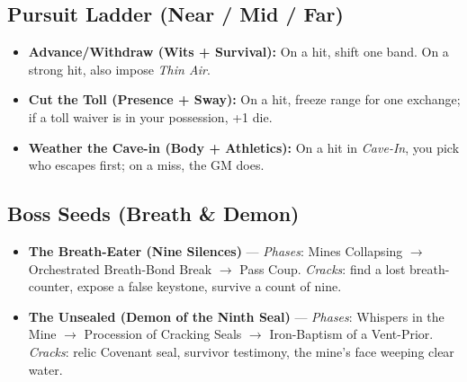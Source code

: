 \subsection*{Pursuit Ladder (Near / Mid / Far)}
\begin{itemize}
\item \textbf{Advance/Withdraw (Wits + Survival):} On a hit, shift one band. On a strong hit, also impose \emph{Thin Air}.
\item \textbf{Cut the Toll (Presence + Sway):} On a hit, freeze range for one exchange; if a toll waiver is in your possession, +1 die.
\item \textbf{Weather the Cave-in (Body + Athletics):} On a hit in \emph{Cave-In}, you pick who escapes first; on a miss, the GM does.
\end{itemize}

\subsection*{Boss Seeds (Breath \& Demon)}
\begin{itemize}
\item \textbf{The Breath-Eater (Nine Silences)} — \emph{Phases}: Mines Collapsing $\rightarrow$ Orchestrated Breath-Bond Break $\rightarrow$ Pass Coup. \emph{Cracks}: find a lost breath-counter, expose a false keystone, survive a count of nine.
\item \textbf{The Unsealed (Demon of the Ninth Seal)} — \emph{Phases}: Whispers in the Mine $\rightarrow$ Procession of Cracking Seals $\rightarrow$ Iron-Baptism of a Vent-Prior. \emph{Cracks}: relic Covenant seal, survivor testimony, the mine's face weeping clear water.
\end{itemize}

